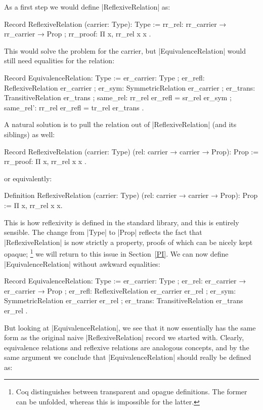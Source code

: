 \documentclass[a4paper,10pt, runningheads]{llncs}
\begin{document}
As a first step we would define |ReflexiveRelation| as:
\begin{code}
  Record ReflexiveRelation (carrier: Type): Type :=
    { rr_rel: rr_carrier → rr_carrier → Prop
    ; rr_proof: Π x, rr_rel x x }.
\end{code}

This would solve the problem for the carrier, but |EquivalenceRelation| would still need equalities
for the relation:
\begin{code}
  Record EquivalenceRelation: Type :=
    { er_carrier: Type
    ; er_refl: ReflexiveRelation er_carrier
    ; er_sym: SymmetricRelation er_carrier
    ; er_trans: TransitiveRelation er_trans
    ; same_rel: rr_rel er_refl = sr_rel er_sym
    ; same_rel': rr_rel er_refl = tr_rel er_trans }.
\end{code}

A natural solution is to pull the relation out of |ReflexiveRelation| (and its siblings) as well:
\begin{code}
  Record ReflexiveRelation (carrier: Type)
                           (rel: carrier → carrier → Prop): Prop :=
    { rr_proof: Π x, rr_rel x x }.
\end{code}
or equivalently:
\begin{code}
  Definition ReflexiveRelation (carrier: Type)
                               (rel: carrier → carrier → Prop): Prop :=
    Π x, rr_rel x x.
\end{code}
This is how reflexivity is defined in the standard library, and this is entirely sensible. The
change from |Type| to |Prop| reflects the fact that |ReflexiveRelation| is now strictly a property,
proofs of which can be nicely kept opaque;%
\footnote{Coq distinguishes between transparent and opague definitions. The former can be unfolded,
whereas this is impossible for the latter.}
we will return to this issue in Section~\ref{PI}.
We can now define |EquivalenceRelation| without awkward equalities:
\begin{code}
  Record EquivalenceRelation: Type :=
    { er_carrier: Type
    ; er_rel: er_carrier → er_carrier → Prop
    ; er_refl: ReflexiveRelation er_carrier er_rel
    ; er_sym: SymmetricRelation er_carrier er_rel
    ; er_trans: TransitiveRelation er_trans er_rel }.
\end{code}

But looking at |EquivalenceRelation|, we see that it now essentially has the same form as the
original naive |ReflexiveRelation| record we started with. Clearly, equivalence relations
and reflexive relations are analogous concepts, and by the same argument we
conclude that |EquivalenceRelation| should really be defined as:
\end{document}
